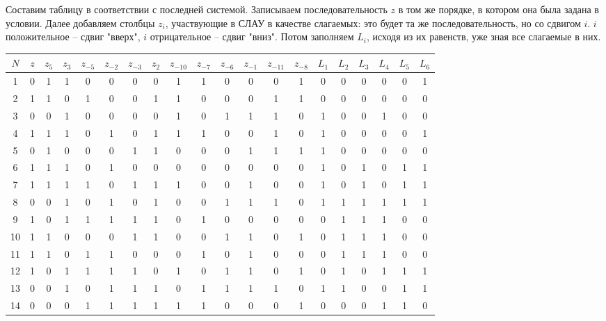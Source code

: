 Составим таблицу в соответствии с последней системой. Записываем последовательность $z$ в том же порядке, в котором она была задана в условии. Далее добавляем столбцы $z_i$, участвующие в СЛАУ в качестве слагаемых: это будет та же последовательность, но со сдвигом $i$. $i$ положительное -- сдвиг "вверх", $i$ отрицательное -- сдвиг "вниз". Потом заполняем $L_i$, исходя из их равенств, уже зная все слагаемые в них.

\medskip

\begin{adjustbox}{center}
\begin{tabular}{||c|c|c|c|c|c|c|c|c|c|c|c|c|c|c|c|c|c|c|c||}
\hline
$N$ & $z$ & $z_5$ & $z_3$ & $z_{-5}$ & $z_{-2}$ & $z_{-3}$ & $z_{2}$ & $z_{-10}$ & $z_{-7}$ & $z_{-6}$ & $z_{-1}$ & $z_{-11}$ & $z_{-8}$ & $L_1$ & $L_2$ & $L_3$ & $L_4$ & $L_5$ & $L_6$\\
\hline
1 & 0 & 1 & 1 & 0 & 0 & 0 & 0 & 1 & 1 & 0 & 0 & 0 & 1 & 0 & 0 & 0 & 0 & 0 & 1 \\
\hline
2 & 1 & 1 & 0 & 1 & 0 & 0 & 1 & 1 & 0 & 0 & 0 & 1 & 1 & 0 & 0 & 0 & 0 & 0 & 0 \\
\hline
3 & 0 & 0 & 1 & 0 & 0 & 0 & 0 & 1 & 0 & 1 & 1 & 1 & 0 & 1 & 0 & 0 & 1 & 0 & 0 \\
\hline
4 & 1 & 1 & 1 & 0 & 1 & 0 & 1 & 1 & 1 & 0 & 0 & 1 & 0 & 1 & 0 & 0 & 0 & 0 & 1 \\
\hline
5 & 0 & 1 & 0 & 0 & 0 & 1 & 1 & 0 & 0 & 0 & 1 & 1 & 1 & 1 & 0 & 0 & 0 & 0 & 0 \\
\hline
6 & 1 & 1 & 1 & 0 & 1 & 0 & 0 & 0 & 0 & 0 & 0 & 0 & 0 & 1 & 0 & 1 & 0 & 1 & 1 \\
\hline
7 & 1 & 1 & 1 & 1 & 0 & 1 & 1 & 1 & 0 & 0 & 1 & 0 & 0 & 1 & 0 & 1 & 0 & 1 & 1 \\
\hline
8 & 0 & 0 & 1 & 0 & 1 & 0 & 1 & 0 & 0 & 1 & 1 & 1 & 0 & 1 & 1 & 1 & 1 & 1 & 1 \\
\hline
9 & 1 & 0 & 1 & 1 & 1 & 1 & 1 & 0 & 1 & 0 & 0 & 0 & 0 & 0 & 1 & 1 & 1 & 0 & 0 \\
\hline
10 & 1 & 1 & 0 & 0 & 0 & 1 & 1 & 0 & 0 & 1 & 1 & 0 & 1 & 0 & 1 & 1 & 1 & 0 & 0 \\
\hline
11 & 1 & 1 & 0 & 1 & 1 & 0 & 0 & 0 & 1 & 0 & 1 & 0 & 0 & 0 & 1 & 1 & 1 & 0 & 0 \\
\hline
12 & 1 & 0 & 1 & 1 & 1 & 1 & 0 & 1 & 0 & 1 & 1 & 0 & 1 & 0 & 1 & 0 & 1 & 1 & 1 \\
\hline
13 & 0 & 0 & 1 & 0 & 1 & 1 & 1 & 0 & 1 & 1 & 1 & 1 & 0 & 1 & 1 & 0 & 0 & 1 & 1 \\
\hline
14 & 0 & 0 & 0 & 1 & 1 & 1 & 1 & 1 & 1 & 0 & 0 & 0 & 1 & 0 & 0 & 0 & 1 & 1 & 0 \\

\end{tabular}
\end{adjustbox}
